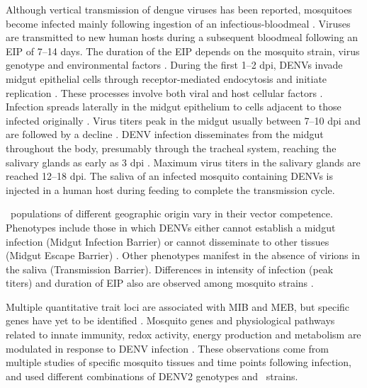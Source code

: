 Although vertical transmission of dengue viruses has been reported, mosquitoes become infected mainly following ingestion of an infectious-bloodmeal \cite{Gunther2007,Angel2008}.
Viruses are transmitted to new human hosts during a subsequent bloodmeal following an \gls{EIP} of 7–14 days.
The duration of the \gls{EIP} depends on the mosquito strain, virus genotype and environmental factors \cite{Watts1987,Black2002,Anderson2006,Salazar2007,Lambrechts2011}.
During the first 1–2 \gls{dpi}, \gls{DENV}s invade midgut epithelial cells through receptor-mediated endocytosis and initiate replication \cite{Bennett2002,Heinz2003,Rey2003,Mercado-Curiel2008}.
These processes involve both viral and host cellular factors \cite{Samsa2009}.
Infection spreads laterally in the midgut epithelium to cells adjacent to those infected originally \cite{Salazar2007}.
Virus titers peak in the midgut usually between 7–10 \gls{dpi} and are followed by a decline \cite{Salazar2007,Xi2008}.
\gls{DENV} infection disseminates from the midgut throughout the body, presumably through the tracheal system, reaching the salivary glands as early as 3 \gls{dpi} \cite{Salazar2007}.
Maximum virus titers in the salivary glands are reached 12–18 \gls{dpi}.
The saliva of an infected mosquito containing \gls{DENV}s is injected in a human host during feeding to complete the transmission cycle.

\Aea\ populations of different geographic origin vary in their vector competence.
Phenotypes include those in which \gls{DENV}s either cannot establish a midgut infection (Midgut Infection Barrier) or cannot disseminate to other tissues (Midgut Escape Barrier) \cite{Black2002,Gubler1976,Cox2011}.
Other phenotypes manifest in the absence of virions in the saliva (Transmission Barrier).
Differences in intensity of infection (peak titers) and duration of \gls{EIP} also are observed among mosquito strains \cite{Salazar2007}.

Multiple quantitative trait loci are associated with MIB and MEB, but specific genes have yet to be identified \cite{Black2002}.
Mosquito genes and physiological pathways related to innate immunity, redox activity, energy production and metabolism are modulated in response to \gls{DENV} infection \cite{Xi2008,Sanchez-Vargas2009,Sim2010,Tchankouo-Nguetcheu2010,Luplertlop2011,Behura2011,Sim2012,Colpitts2011}.
These observations come from multiple studies of specific mosquito tissues and time points following infection, and used different combinations of \gls{DENV}2 genotypes and \Aa\ strains.

